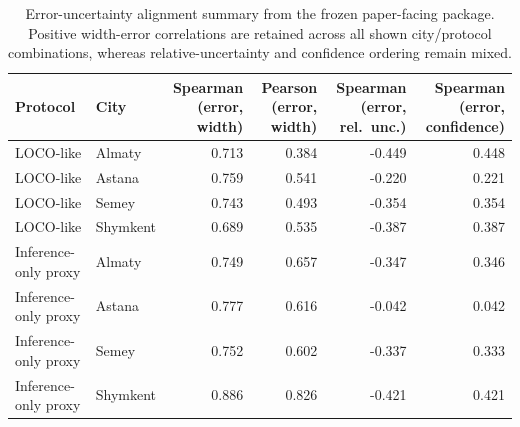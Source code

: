 \begin{table}[H]
\centering
\scriptsize
\caption{Error-uncertainty alignment summary from the frozen paper-facing package. Positive width-error correlations are retained across all shown city/protocol combinations, whereas relative-uncertainty and confidence ordering remain mixed.}
\label{tab:error-alignment}
\begin{tabular}{p{2.4cm}p{1.4cm}rrrr}
\toprule
Protocol & City & \shortstack{Spearman\\(error, width)} & \shortstack{Pearson\\(error, width)} & \shortstack{Spearman\\(error, rel.\ unc.)} & \shortstack{Spearman\\(error, confidence)} \\
\midrule
LOCO-like & Almaty   & 0.713 & 0.384 & -0.449 & 0.448 \\
LOCO-like & Astana   & 0.759 & 0.541 & -0.220 & 0.221 \\
LOCO-like & Semey    & 0.743 & 0.493 & -0.354 & 0.354 \\
LOCO-like & Shymkent & 0.689 & 0.535 & -0.387 & 0.387 \\
Inference-only proxy & Almaty   & 0.749 & 0.657 & -0.347 & 0.346 \\
Inference-only proxy & Astana   & 0.777 & 0.616 & -0.042 & 0.042 \\
Inference-only proxy & Semey    & 0.752 & 0.602 & -0.337 & 0.333 \\
Inference-only proxy & Shymkent & 0.886 & 0.826 & -0.421 & 0.421 \\
\bottomrule
\end{tabular}
\end{table}
